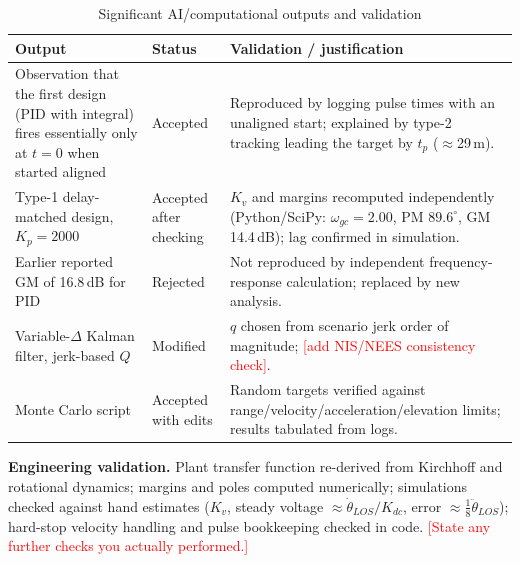 \documentclass[10pt, conference]{IEEEtran}
\newcommand{\todo}[1]{\textcolor{red}{[#1]}}
\begin{document}
\begin{table}[h]
\caption{Significant AI/computational outputs and validation}
\centering\scriptsize
\begin{tabular}{p{1.9cm}p{1.0cm}p{4.6cm}}
\toprule
Output & Status & Validation / justification\\
\midrule
Observation that the first design (PID with integral) fires essentially only at $t=0$ when started aligned & Accepted & Reproduced by logging pulse times with an unaligned start; explained by type-2 tracking leading the target by $t_p$ ($\approx$29\,m).\\
Type-1 delay-matched design, $K_p=2000$ & Accepted after checking & $K_v$ and margins recomputed independently (Python/SciPy: $\omega_{gc}=2.00$, PM $89.6^\circ$, GM 14.4\,dB); lag confirmed in simulation.\\
Earlier reported GM of 16.8\,dB for PID & Rejected & Not reproduced by independent frequency-response calculation; replaced by new analysis.\\
Variable-$\Delta$ Kalman filter, jerk-based $Q$ & Modified & $q$ chosen from scenario jerk order of magnitude; \todo{add NIS/NEES consistency check}.\\
Monte Carlo script & Accepted with edits & Random targets verified against range/velocity/acceleration/elevation limits; results tabulated from logs.\\
\bottomrule
\end{tabular}
\end{table}
\textbf{Engineering validation.} Plant transfer function re-derived from Kirchhoff and rotational dynamics; margins and poles computed numerically; simulations checked against hand estimates ($K_v$, steady voltage $\approx\dot\theta_{LOS}/K_{dc}$, error $\approx\tfrac18\ddot\theta_{LOS}$); hard-stop velocity handling and pulse bookkeeping checked in code. \todo{State any further checks you actually performed.}
\end{document}
